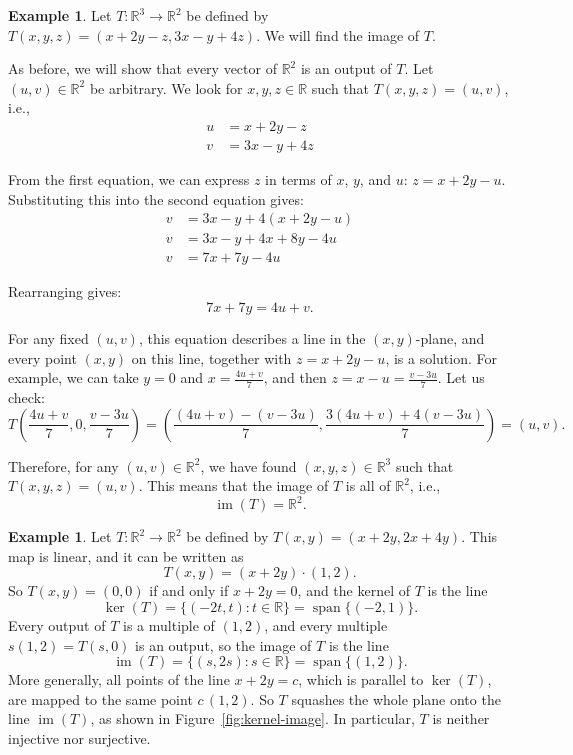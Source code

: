 \documentclass[11pt]{article}
\theoremstyle{definition}
\newtheorem{example}[definition]{Example}
\theoremstyle{plain}
\theoremstyle{remark}
\DeclareMathOperator{\im}{im}
\DeclareMathOperator{\Span}{span}
\begin{document}
\begin{example}\label{ex:im2}
    Let $T: \mathbb{R}^3 \to \mathbb{R}^2$ be defined by $T(x, y, z) = (x + 2y - z, 3x - y + 4z)$. We will find the image of $T$.

    As before, we will show that every vector of $\mathbb{R}^2$ is an output of $T$. Let $(u, v) \in \mathbb{R}^2$ be arbitrary. We look for $x, y, z \in \mathbb{R}$ such that $T(x, y, z) = (u, v)$, i.e.,
    \begin{align*}
        u &= x + 2y - z \\
        v &= 3x - y + 4z
    \end{align*}

    From the first equation, we can express $z$ in terms of $x$, $y$, and $u$: $z = x + 2y - u$. Substituting this into the second equation gives:
    \begin{align*}
        v &= 3x - y + 4(x + 2y - u) \\
        v &= 3x - y + 4x + 8y - 4u \\
        v &= 7x + 7y - 4u
    \end{align*}

    Rearranging gives:
    \[7x + 7y = 4u + v.\]

    For any fixed $(u, v)$, this equation describes a line in the $(x, y)$-plane, and every point $(x, y)$ on this line, together with $z = x + 2y - u$, is a solution. For example, we can take $y = 0$ and $x = \frac{4u + v}{7}$, and then $z = x - u = \frac{v - 3u}{7}$. Let us check:
    \[T\left(\frac{4u + v}{7}, 0, \frac{v - 3u}{7}\right) = \left(\frac{(4u + v) - (v - 3u)}{7}, \frac{3(4u + v) + 4(v - 3u)}{7}\right) = (u, v).\]

    Therefore, for any $(u, v) \in \mathbb{R}^2$, we have found $(x, y, z) \in \mathbb{R}^3$ such that $T(x, y, z) = (u, v)$. This means that the image of $T$ is all of $\mathbb{R}^2$, i.e.,
    \[\im(T) = \mathbb{R}^2.\]
\end{example}

\begin{example}\label{ex:kerim-picture}
    Let $T: \mathbb{R}^2 \to \mathbb{R}^2$ be defined by $T(x, y) = (x + 2y, 2x + 4y)$. This map is linear, and it can be written as
    \[T(x, y) = (x + 2y) \cdot (1, 2).\]
    So $T(x, y) = (0, 0)$ if and only if $x + 2y = 0$, and the kernel of $T$ is the line
    \[\ker(T) = \{(-2t, t) : t \in \mathbb{R}\} = \Span\{(-2, 1)\}.\]
    Every output of $T$ is a multiple of $(1, 2)$, and every multiple $s(1, 2) = T(s, 0)$ is an output, so the image of $T$ is the line
    \[\im(T) = \{(s, 2s) : s \in \mathbb{R}\} = \Span\{(1, 2)\}.\]
    More generally, all points of the line $x + 2y = c$, which is parallel to $\ker(T)$, are mapped to the same point $c\,(1, 2)$. So $T$ squashes the whole plane onto the line $\im(T)$, as shown in Figure~\ref{fig:kernel-image}. In particular, $T$ is neither injective nor surjective.
\end{example}
\end{document}
